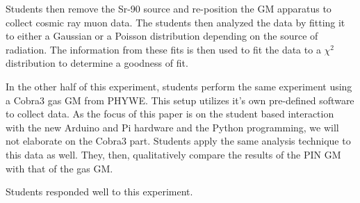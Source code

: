 Students then remove the Sr-90 source and re-position the GM apparatus to collect cosmic ray muon data.
The students then analyzed the data by fitting it to either a Gaussian or a Poisson distribution depending on the source of radiation.
The information from these fits is then used to fit the data to a $\chi^{2}$ distribution to determine a goodness of fit.


In the other half of this experiment, students perform the same experiment using a Cobra3 gas GM from PHYWE.
This setup utilizes it's own pre-defined software to collect data.
As the focus of this paper is on the student based interaction with the new Arduino and Pi hardware and the Python programming, we will not elaborate on the Cobra3 part.
Students apply the same analysis technique to this data as well.
They, then, qualitatively compare the results of the PIN GM with that of the gas GM.

Students responded well to this experiment.
